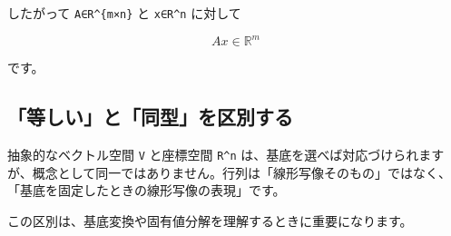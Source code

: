 \documentclass[
  11pt,
  a4paper,
]{ltjsarticle}
\begin{document}
したがって \texttt{A∈R\^{}\{m×n\}} と \texttt{x∈R\^{}n} に対して

\[
Ax\in\mathbb{R}^m
\]

です。

\hypertarget{ux7b49ux3057ux3044ux3068ux540cux578bux3092ux533aux5225ux3059ux308b}{%
\subsection{「等しい」と「同型」を区別する}\label{ux7b49ux3057ux3044ux3068ux540cux578bux3092ux533aux5225ux3059ux308b}}

抽象的なベクトル空間 \texttt{V} と座標空間 \texttt{R\^{}n}
は、基底を選べば対応づけられますが、概念として同一ではありません。行列は「線形写像そのもの」ではなく、「基底を固定したときの線形写像の表現」です。

この区別は、基底変換や固有値分解を理解するときに重要になります。
\end{document}
